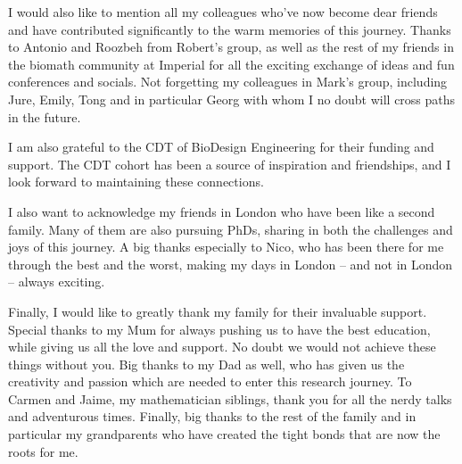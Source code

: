 \documentclass[
    11pt,
    oneside, %
    english,
    onehalfspacing, %
parskip, %
]{PhDDoctoralThesis}
\begin{document}
        I would also like to mention all my colleagues who've now become dear friends and have contributed significantly to the warm memories of this journey.
       Thanks to Antonio and Roozbeh from Robert's group, as well as the rest of my friends in the biomath community at Imperial for all the exciting exchange of ideas and fun conferences and socials.
       Not forgetting my colleagues in Mark's group, including Jure, Emily, Tong and in particular Georg with whom I no doubt will cross paths in the future.

       I am also grateful to the CDT of BioDesign Engineering for their funding and support.
       The CDT cohort has been a source of inspiration and friendships, and I look forward to maintaining these connections.

       I also want to acknowledge my friends in London who have been like a second family.
       Many of them are also pursuing PhDs, sharing in both the challenges and joys of this journey.
       A big thanks especially to Nico, who has been there for me through the best and the worst, making my days in London – and not in London – always exciting.


Finally, I would like to greatly thank my family for their invaluable support.
       Special thanks to my Mum for always pushing us to have the best education, while giving us all the love and support.
       No doubt we would not achieve these things without you.
       Big thanks to my Dad as well, who has given us the creativity and passion which are needed to enter this research journey.
       To Carmen and Jaime, my mathematician siblings, thank you for all the nerdy talks and adventurous times.
       Finally, big thanks to the rest of the family and in particular my grandparents who have created the tight bonds that are now the roots for me.



    \tableofcontents





    \mainmatter %

    \pagestyle{thesis} %

    \clearpage

    
    
    
    
    
    

    \printglossary[type=\acronymtype]

    \printbibliography[heading=bibintoc]
    
\end{document}
